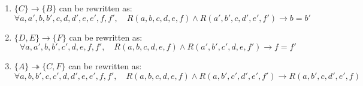 \documentclass{../../cs-classes/cs-classes}
\begin{document}
\begin{exercise}
    \leavevmode
    \begin{enumerate}
        \item $\{C\} \rightarrow \{B\}$ can be rewritten as:
              \begin{equation*}
                  \forall a, a', b, b', c, d, d', e, e', f, f', \quad R(a, b, c, d, e, f) \land R(a', b', c, d', e', f') \rightarrow b=b'
              \end{equation*}
        \item $\{D, E\} \rightarrow \{F\}$ can be rewritten as:
              \begin{equation*}
                  \forall a, a', b, b', c', d, e, f, f', \quad R(a, b, c, d, e, f) \land R(a', b', c', d, e, f') \rightarrow f=f'
              \end{equation*}
        \item $\{A\} \twoheadrightarrow \{C, F\}$ can be rewritten as:
              \begin{equation*}
                  \forall a, b, b', c, c', d, d', e, e', f, f', \quad R(a, b, c, d, e, f) \land R(a, b', c', d', e', f') \rightarrow R(a, b', c, d', e', f)
              \end{equation*}
    \end{enumerate}
\end{exercise}
\end{document}
